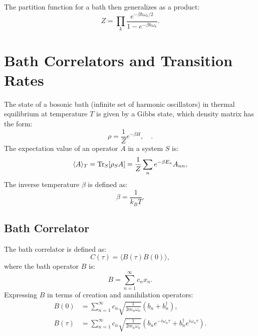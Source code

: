 The partition function for a bath then generalizes as a product:
\begin{equation} \label{eq:generalized_partition_function}
Z = \prod_k \frac{e^{-\beta \hbar \omega_k / 2}}{1 - e^{-\beta \hbar \omega_k}}.
\end{equation}


\section{Bath Correlators and Transition Rates}
\label{sec:bath_corr_trans_rates}

The state of a bosonic bath (infinite set of harmonic oscillators) in thermal equilibrium at temperature \( T \) is given by a Gibbs state, which density matrix has the form:
\begin{equation} \label{eq:Gibbs_state}
\rho = \frac{1}{Z} e^{-\beta H}, \quad .
\end{equation}
The expectation value of an operator \( A \) in a system \( S \) is:
\begin{equation} \label{eq:expectation_value_bath}
\langle A \rangle_T = \mathrm{Tr}_S[\rho_S A] = \frac{1}{Z} \sum_n e^{-\beta E_n} A_{nn},
\end{equation}
The inverse temperature \(\beta\) is defined as:
\begin{equation} \label{eq:beta_definition}
\beta = \frac{1}{k_B T}.
\end{equation}

\subsection{Bath Correlator}
\label{subsec:bath_correlator}

The bath correlator is defined as:
\begin{equation} \label{eq:bath_correlator}
C(\tau) = \langle B(\tau) B(0) \rangle,
\end{equation}
where the bath operator \( B \) is:
\begin{equation} \label{eq:bath_operator}
B = \sum_{n=1}^{\infty} c_n x_n.
\end{equation}
Expressing \( B \) in terms of creation and annihilation operators:
\begin{align}
B(0) &= \sum_{n=1}^{\infty} c_n \sqrt{\frac{1}{2 m_n \omega_n}} (b_n + b_n^\dagger), \label{eq:bath_operator_t0} \\
B(\tau) &= \sum_{n=1}^{\infty} c_n \sqrt{\frac{1}{2 m_n \omega_n}} \left( b_n e^{-i \omega_n \tau} + b_n^\dagger e^{i \omega_n \tau} \right). \label{eq:bath_operator_tau}
\end{align}


